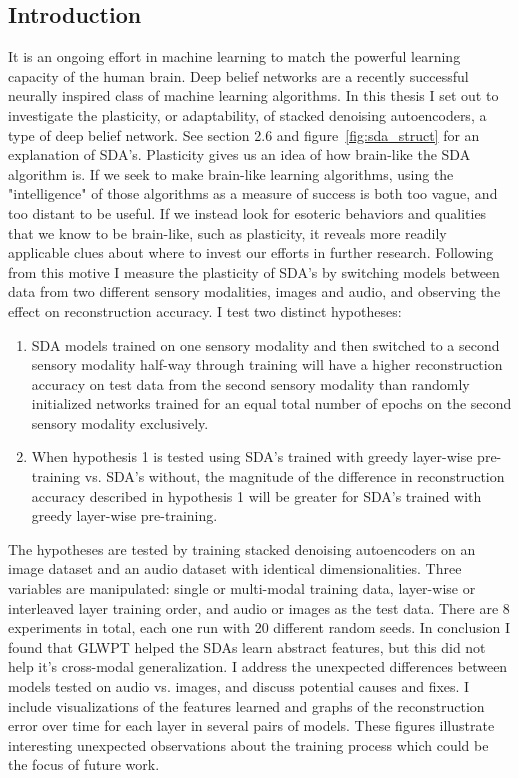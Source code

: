 \documentclass[12pt]{article}
\begin{document}
\begin{doublespacing}
	\subsection{Introduction}
		It is an ongoing effort in machine learning to match the powerful learning capacity of the human brain. Deep belief networks are a recently successful neurally inspired class of machine learning algorithms. In this thesis I set out to investigate the plasticity, or adaptability, of stacked denoising autoencoders, a type of deep belief network. See section 2.6 and figure~\ref{fig:sda_struct} for an explanation of SDA's. Plasticity gives us an idea of how brain-like the SDA algorithm is. If we seek to make brain-like learning algorithms, using the "intelligence" of those algorithms as a measure of success is both too vague, and too distant to be useful. If we instead look for esoteric behaviors and qualities that we know to be brain-like, such as plasticity, it reveals more readily applicable clues about where to invest our efforts in further research\cite{hinton1995wake}.
		Following from this motive I measure the plasticity of SDA's by switching models between data from two different sensory modalities, images and audio, and observing the effect on reconstruction accuracy. I test two distinct hypotheses:
\begin{enumerate}
	\item SDA models trained on one sensory modality and then switched to a second sensory modality half-way through training will have a higher reconstruction accuracy on test data from the second sensory modality than randomly initialized networks trained for an equal total number of epochs on the second sensory modality exclusively.
	\item When hypothesis 1 is tested using SDA's trained with greedy layer-wise pre-training vs. SDA's without, the magnitude of the difference in reconstruction accuracy described in hypothesis 1 will be greater for SDA's trained with greedy layer-wise pre-training.
\end{enumerate}
		The hypotheses are tested by training stacked denoising autoencoders on an image dataset and an audio dataset with identical dimensionalities. Three variables are manipulated: single or multi-modal training data, layer-wise or interleaved layer training order, and audio or images as the test data. There are 8 experiments in total, each one run with 20 different random seeds.
		In conclusion I found that GLWPT helped the SDAs learn abstract features, but this did not help it's cross-modal generalization. I address the unexpected differences between models tested on audio vs. images, and discuss potential causes and fixes. I include visualizations of the features learned and graphs of the reconstruction error over time for each layer in several pairs of models. These figures illustrate interesting unexpected observations about the training process which could be the focus of future work.


\end{doublespacing}
\end{document}
